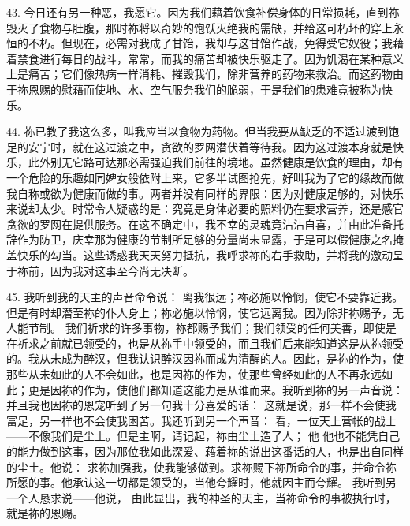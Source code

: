 43. 今日还有另一种恶，我愿它。因为我们藉着饮食补偿身体的日常损耗，直到祢毁灭了食物与肚腹，那时祢将以奇妙的饱饫灭绝我的需缺，并给这可朽坏的穿上永恒的不朽。但现在，必需对我成了甘饴，我却与这甘饴作战，免得受它奴役；我藉着禁食进行每日的战斗，常常，而我的痛苦却被快乐驱走了。因为饥渴在某种意义上是痛苦；它们像热病一样消耗、摧毁我们，除非营养的药物来救治。而这药物由于祢恩赐的慰藉而使地、水、空气服务我们的脆弱，于是我们的患难竟被称为快乐。\par

44. 祢已教了我这么多，叫我应当以食物为药物。但当我要从缺乏的不适过渡到饱足的安宁时，就在这过渡之中，贪欲的罗网潜伏着等待我。因为这过渡本身就是快乐，此外别无它路可达那必需强迫我们前往的境地。虽然健康是饮食的理由，却有一个危险的乐趣如同婢女般依附上来，它多半试图抢先，好叫我为了它的缘故而做我自称或欲为健康而做的事。两者并没有同样的界限：因为对健康足够的，对快乐来说却太少。时常令人疑惑的是：究竟是身体必要的照料仍在要求营养，还是感官贪欲的罗网在提供服务。在这不确定中，我不幸的灵魂竟沾沾自喜，并由此准备托辞作为防卫，庆幸那为健康的节制所足够的分量尚未显露，于是可以假健康之名掩盖快乐的勾当。这些诱惑我天天努力抵抗，我呼求祢的右手救助，并将我的激动呈于祢前，因为我对这事至今尚无决断。\par

45. 我听到我的天主的声音命令说： 离我很远；祢必施以怜悯，使它不要靠近我。但是有时却潜至祢的仆人身上；祢必施以怜悯，使它远离我。因为除非祢赐予，无人能节制。 我们祈求的许多事物，祢都赐予我们；我们领受的任何美善，即使是在祈求之前就已领受的，也是从祢手中领受的，而且我们后来能知道这是从祢领受的。我从未成为醉汉，但我认识醉汉因祢而成为清醒的人。因此，是祢的作为，使那些从未如此的人不会如此，也是因祢的作为，使那些曾经如此的人不再永远如此；更是因祢的作为，使他们都知道这能力是从谁而来。我听到祢的另一声音说： 并且我也因祢的恩宠听到了另一句我十分喜爱的话： 这就是说，那一样不会使我富足，另一样也不会使我困苦。我还听到另一个声音： 看，一位天上营帐的战士——不像我们是尘土。但是主啊，请记起，祢由尘土造了人； 他 他也不能凭自己的能力做到这事，因为那位我如此深爱、藉着祢的说出这番话的人，也是出自同样的尘土。他说： 求祢加强我，使我能够做到。求祢赐下祢所命令的事，并命令祢所愿的事。他承认这一切都是领受的，当他夸耀时，他就因主而夸耀。 我听到另一个人恳求说——他说， 由此显出，我的神圣的天主，当祢命令的事被执行时，就是祢的恩赐。\par

